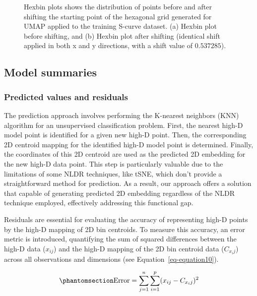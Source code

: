 \documentclass[
  12pt]{article}
\begin{document}
\begin{figure}[H]


\caption{\label{fig-scurveshifthexgrids}Hexbin plots shows the
distribution of points before and after shifting the starting point of
the hexagonal grid generated for UMAP applied to the training S-curve
dataset. (a) Hexbin plot before shifting, and (b) Hexbin plot after
shifting (identical shift applied in both x and y directions, with a
shift value of \(0.537285\)).}

\end{figure}%

\subsection{Model summaries}\label{sec-summary}

\subsubsection{Predicted values and
residuals}\label{predicted-values-and-residuals}

The prediction approach involves performing the K-nearest neighbors
(KNN) algorithm for an unsupervised classification problem. First, the
nearest high-D model point is identified for a given new high-D point.
Then, the corresponding 2D centroid mapping for the identified high-D
model point is determined. Finally, the coordinates of this 2D centroid
are used as the predicted 2D embedding for the new high-D data point.
This step is particularly valuable due to the limitations of some NLDR
techniques, like tSNE, which don't provide a straightforward method for
prediction. As a result, our approach offers a solution that capable of
generating predicted 2D embedding regardless of the NLDR technique
employed, effectively addressing this functional gap.

Residuals are essential for evaluating the accuracy of representing
high-D points by the high-D mapping of 2D bin centroids. To measure this
accuracy, an error metric is introduced, quantifying the sum of squared
differences between the high-D data (\(x_{ij}\)) and the high-D mapping
of the 2D bin centroid data (\(C_{x_ij}\)) across all observations and
dimensions (see Equation~\ref{eq-equation10}).

\begin{equation}\phantomsection\label{eq-equation10}{
\text{Error} = \sum_{j = 1}^{n}\sum_{i = 1}^{p} (x_{ij} - C_{x_ij})^2
}\end{equation}
\end{document}
